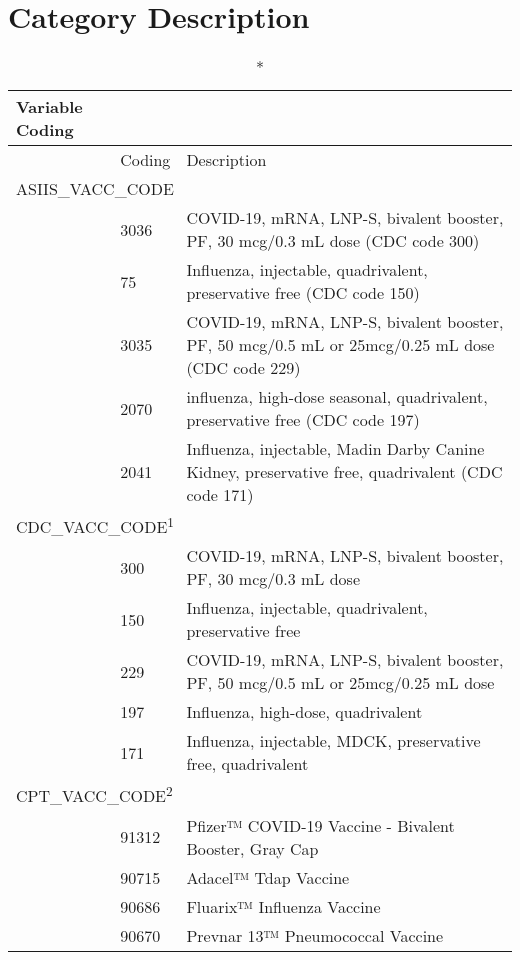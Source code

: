 \documentclass[
  letterpaper,
  DIV=11,
  numbers=noendperiod]{scrreprt}
\begin{document}
\hypertarget{category-description-45}{%
\section*{Category Description}\label{category-description-45}}

\setlength{\LTpost}{0mm}
\begin{longtable}{l|ll}
\caption*{
{\large Variable Coding}
} \\ 
\toprule
\multicolumn{1}{l}{} & Coding & Description \\ 
\midrule
\multicolumn{3}{l}{ASIIS\_VACC\_CODE} \\ 
\midrule
  & 3036 & COVID-19, mRNA, LNP-S, bivalent booster, PF, 30 mcg/0.3 mL dose (CDC code 300) \\ 
  & 75 & Influenza, injectable, quadrivalent, preservative free (CDC code 150) \\ 
  & 3035 & COVID-19, mRNA, LNP-S, bivalent booster, PF, 50 mcg/0.5 mL or 25mcg/0.25 mL dose (CDC code 229) \\ 
  & 2070 & influenza, high-dose seasonal, quadrivalent, preservative free (CDC code 197) \\ 
  & 2041 & Influenza, injectable, Madin Darby Canine Kidney, preservative free, quadrivalent (CDC code 
                       171) \\ 
\midrule
\multicolumn{3}{l}{CDC\_VACC\_CODE\textsuperscript{1}} \\ 
\midrule
  & 300 & COVID-19, mRNA, LNP-S, bivalent booster, PF, 30 mcg/0.3 mL dose \\ 
  & 150 & Influenza, injectable, quadrivalent, preservative free \\ 
  & 229 & COVID-19, mRNA, LNP-S, bivalent booster, PF, 50 mcg/0.5 mL or 25mcg/0.25 mL dose \\ 
  & 197 & Influenza, high-dose, quadrivalent \\ 
  & 171 & Influenza, injectable, MDCK, preservative free, quadrivalent \\ 
\midrule
\multicolumn{3}{l}{CPT\_VACC\_CODE\textsuperscript{2}} \\ 
\midrule
  & 91312 & Pfizer™ COVID-19 Vaccine - Bivalent Booster, Gray Cap \\ 
  & 90715 & Adacel™ Tdap Vaccine \\ 
  & 90686 & Fluarix™ Influenza Vaccine \\ 
  & 90670 & Prevnar 13™ Pneumococcal Vaccine \\ 

\end{longtable}
\end{document}
